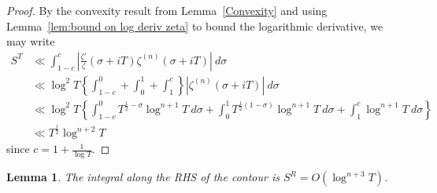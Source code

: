 \documentclass[12pt,a4paper,reqno]{amsart}
\newtheorem{lemma}{Lemma}
\theoremstyle{remark}
\numberwithin{equation}{section}
\begin{document}
\begin{proof}
By the convexity result from Lemma~\ref{Convexity} and using Lemma~\ref{lem:bound on log deriv zeta} to bound the logarithmic derivative, we may write
\begin{align*}
    S^T & \ll \int_{1-c}^{c} \left| \frac{\zeta '}{\zeta} (\sigma + iT) \zeta ^{(n)} (\sigma + iT) \right| \ d\sigma \\
    & \ll \log^2 T \left\{ \int_{1-c}^{0} + \int_{0}^{1} + \int_{1}^{c} \right\} \left| \zeta ^{(n)} (\sigma + iT) \right| \ d\sigma \\
    & \ll \log^2 T \left\{ \int_{1-c}^{0} T^{\frac{1}{2} - \sigma} \log^{n+1} T \ d\sigma + \int_{0}^{1} T^{\frac{1}{2} (1-\sigma)} \log^{n+1} T \ d\sigma + \int_{1}^{c} \log^{n+1} T \ d\sigma \right\} \\
    & \ll T^{\frac{1}{2}} \log^{n+2} T
\end{align*}
since $c=1+ \frac{1}{\log T}$.
\end{proof}







\begin{lemma}
The integral along the RHS of the contour is $S^R = O(\log^{n+3} T)$.
\end{lemma}
\end{document}
